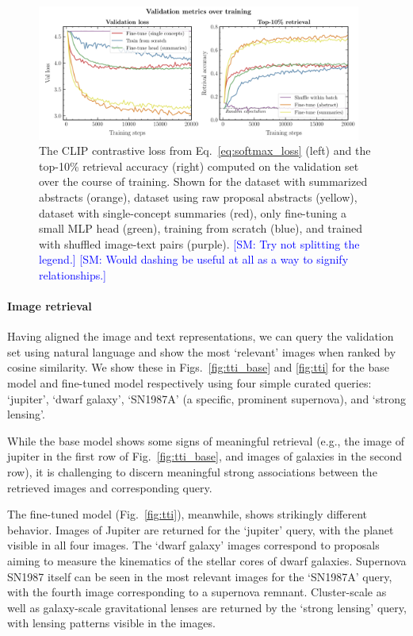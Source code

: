 \documentclass[10pt]{article} %
\newcommand{\SM}[1]{\textcolor{blue}{[SM: #1]}}
\begin{document}
\begin{figure}[!h]
  \includegraphics[width=0.95\textwidth]{plots/val_metrics.pdf}
  \caption{The CLIP contrastive loss from Eq.~\ref{eq:softmax_loss} (left) and the top-10\% retrieval accuracy (right) computed on the validation set over the course of training. Shown for the dataset with summarized abstracts (orange), dataset using raw proposal abstracts (yellow), dataset with single-concept summaries (red), only fine-tuning a small MLP head (green), training from scratch (blue), and trained with shuffled image-text pairs (purple). \SM{Try not splitting the legend.} \SM{Would dashing be useful at all as a way to signify relationships.}}
  \label{fig:retrieval_acc}
  \end{figure}

\paragraph*{Image retrieval}

Having aligned the image and text representations, we can query the validation set using natural language and show the most `relevant' images when ranked by cosine similarity.
%
We show these in Figs.~\ref{fig:tti_base} and \ref{fig:tti} for the base model and fine-tuned model respectively using four simple curated queries: `jupiter', `dwarf galaxy', `SN1987A' (a specific, prominent supernova), and `strong lensing'.

While the base model shows some signs of meaningful retrieval (e.g., the image of jupiter in the first row of Fig.~\ref{fig:tti_base}, and images of galaxies in the second row), it is challenging to discern meaningful strong associations between the retrieved images and corresponding query.

The fine-tuned model (Fig.~\ref{fig:tti}), meanwhile, shows strikingly different behavior.
%
%
Images of Jupiter are returned for the `jupiter' query, with the planet visible in all four images.
%
The `dwarf galaxy' images correspond to proposals aiming to measure the kinematics of the stellar cores of dwarf galaxies.
%
Supernova SN1987 itself can be seen in the most relevant images for the `SN1987A' query, with the fourth image corresponding to a supernova remnant.
%
Cluster-scale as well as galaxy-scale gravitational lenses are returned by the `strong lensing' query, with lensing patterns visible in the images.
\end{document}
